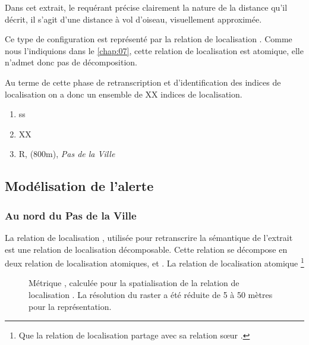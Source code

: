 Dans cet extrait, le requérant précise clairement la nature de la
distance qu'il décrit, il s'agit d'une distance à vol d'oiseau,
visuellement approximée.

Ce type de configuration est représenté par la relation de
localisation
. Comme nous
l'indiquions dans le \autoref{chap:07}, cette relation de localisation
est atomique, elle n'admet donc pas de décomposition.

%
Au terme de cette phase de retranscription et d'identification des
indices de localisation on a donc un ensemble de XX indices de
localisation.
%
\begin{enumerate}
\item ss
\item XX
\item R, (800m), \emph{Pas de la Ville}
\end{enumerate}


\subsection{Modélisation de l'alerte}
\label{subsec:9-2-2}




\subsubsection{Au nord du Pas de la Ville}

La relation de localisation ,
utilisée pour retranscrire la sémantique de l'extrait  est
une relation de localisation décomposable.
%
Cette relation se décompose en deux relation de localisation
atomiques,  et
. La relation de localisation
atomique  \footnote{Que la relation de
  localisation \protect{} partage avec
  sa relation sœur \protect{}.}


\begin{figure}
  \centering
  
  \caption{Métrique \protect{}, calculée
    pour la spatialisation de la relation de localisation
    \protect{}. La résolution du raster a
    été réduite de 5 à 50 mètres pour la représentation.}
  \label{fig:veyont_EcartNord}
\end{figure}


